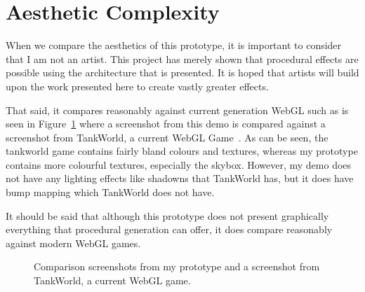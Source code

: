 
\section{Aesthetic Complexity}
When we compare the aesthetics of this prototype, it is important to consider that I am not an artist.
This project has merely shown that procedural effects are possible using the architecture that is presented.
It is hoped that artists will build upon the work presented here to create vastly greater effects.

That said, it compares reasonably against current generation WebGL such as is seen in Figure~\ref{fig:minevstank} where a screenshot from this demo is compared against a screenshot from TankWorld, a current WebGL Game~\cite{web:tankworld}.
As can be seen, the tankworld game contains fairly bland colours and textures, whereas my prototype contains more colourful textures, especially the skybox.
However, my demo does not have any lighting effects like shadowns that TankWorld has, but it does have bump mapping which TankWorld does not have.

It should be said that although this prototype does not present graphically everything that procedural generation can offer, it does compare reasonably against modern WebGL games.

\begin{figure}
  \centering
  \caption{Comparison screenshots from my prototype and a screenshot from TankWorld, a current WebGL game.}
  \label{fig:minevstank}
\end{figure}

